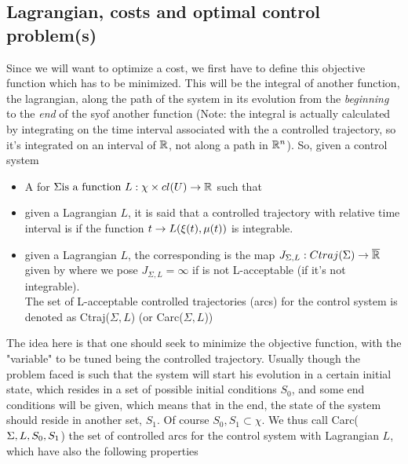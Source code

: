 \subsection{Lagrangian, costs and optimal control problem(s)}
Since we will want to optimize a cost, we first have to define this objective function which has to be minimized. This will be the integral of another function, the lagrangian, along the path of the system in its evolution from the \textit{beginning} to the \textit{end} of the syof another function (Note: the integral is actually calculated by integrating on the time interval associated with the a controlled trajectory, so it's integrated on an interval of $\mathbb{R}$, not along a path in $\mathbb{R}^n$). So, given a control system \controlSystem
\begin{itemize}
	\item A for $\Sigma\text{is a function }L:\chi\times cl(U)\rightarrow\mathbb{R}$ such that
	
	\item given a Lagrangian $L$, it is said that a controlled trajectory \controlledTraj with relative time interval \I is  if the function $t\rightarrow L(\xi (t),\mu(t))$ is integrable.
	
	\item given a Lagrangian $L$, the corresponding  is the map $J_{\Sigma,L}:Ctraj(\Sigma)\rightarrow\overline{\mathbb{R}}$ given by 
	where we pose $J_{\Sigma,L}=\infty$ if \controlledTraj is not L-acceptable (if it's not integrable).\\
	The set of L-acceptable controlled trajectories (arcs) for the control system is denoted as Ctraj($\Sigma,L$) (or Carc($\Sigma,L$))
\end{itemize}
The idea here is that one should seek to minimize the objective function, with the "variable" to be tuned being the controlled trajectory. Usually though the problem faced is such that the system will start his evolution in a certain initial state, which resides in a set of possible initial conditions $S_0$, and some end conditions will be given, which means that in the end, the state of the system should reside in another set, $S_1$. Of course $S_0,S_1\subset\chi$. We thus call Carc($\Sigma,L,S_0,S_1$) the set of controlled arcs for the control system \controlSystem with Lagrangian $L$, which have also the following properties

